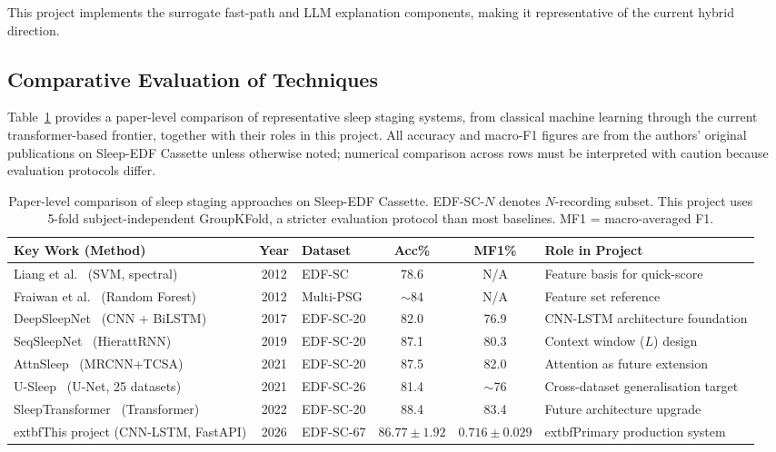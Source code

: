 \documentclass[10pt]{article}
\begin{document}
This project implements the surrogate fast-path and LLM explanation components, making it representative of the current hybrid direction.

\subsection{Comparative Evaluation of Techniques}
\label{sec:comparison}

Table~\ref{tab:method-compare} provides a paper-level comparison of representative sleep staging systems, from classical machine learning through the current transformer-based frontier, together with their roles in this project. All accuracy and macro-F1 figures are from the authors' original publications on Sleep-EDF Cassette unless otherwise noted; numerical comparison across rows must be interpreted with caution because evaluation protocols differ.

\begin{table}[h]
\centering
\small
\renewcommand{\arraystretch}{1.25}
\begin{tabular}{|p{3.1cm}|c|p{1.8cm}|c|c|p{2.4cm}|}
\hline
\textbf{Key Work (Method)} & \textbf{Year} & \textbf{Dataset} & \textbf{Acc\%} & \textbf{MF1\%} & \textbf{Role in Project} \\\hline
Liang et al.~\cite{liang2012automatic} (SVM, spectral) & 2012 & EDF-SC & 78.6 & N/A & Feature basis for quick-score \\\hline
Fraiwan et al.~\cite{fraiwan2012automated} (Random Forest) & 2012 & Multi-PSG & $\sim$84 & N/A & Feature set reference \\\hline
DeepSleepNet~\cite{supratak2017deepsleepnet} (CNN + BiLSTM) & 2017 & EDF-SC-20 & 82.0 & 76.9 & CNN-LSTM architecture foundation \\\hline
SeqSleepNet~\cite{phan2019seqsleepnet} (HierattRNN) & 2019 & EDF-SC-20 & 87.1 & 80.3 & Context window ($L$) design \\\hline
AttnSleep~\cite{eldele2021attention} (MRCNN+TCSA) & 2021 & EDF-SC-20 & 87.5 & 82.0 & Attention as future extension \\\hline
U-Sleep~\cite{perslev2021usleep} (U-Net, 25 datasets) & 2021 & EDF-SC-26 & 81.4 & $\sim$76 & Cross-dataset generalisation target \\\hline
SleepTransformer~\cite{phan2022sleeptransformer} (Transformer) & 2022 & EDF-SC-20 & 88.4 & 83.4 & Future architecture upgrade \\\hline
	extbf{This project} (CNN-LSTM, FastAPI) & 2026 & EDF-SC-67 & $\mathbf{86.77 \pm 1.92}$ & $\mathbf{0.716 \pm 0.029}$ & 	extbf{Primary production system} \
\end{tabular}
\caption{Paper-level comparison of sleep staging approaches on Sleep-EDF Cassette. EDF-SC-$N$ denotes $N$-recording subset. This project uses 5-fold subject-independent GroupKFold, a stricter evaluation protocol than most baselines. MF1 = macro-averaged F1.}
\label{tab:method-compare}
\end{table}
\end{document}
